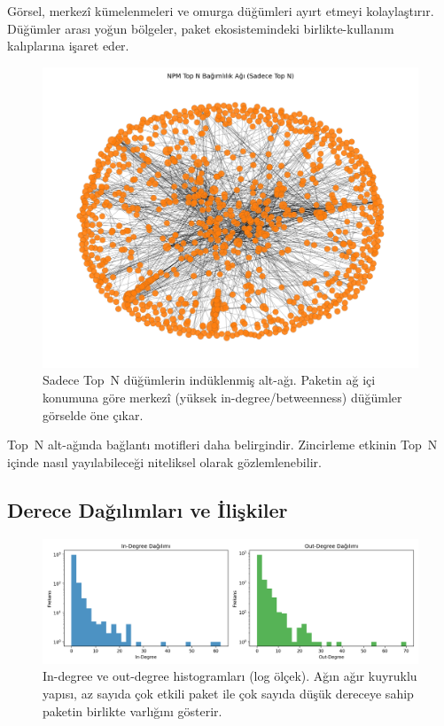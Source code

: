 \documentclass[11pt,a4paper]{article}
\begin{document}
\noindent Görsel, merkezî kümelenmeleri ve omurga düğümleri ayırt etmeyi kolaylaştırır. Düğümler arası yoğun bölgeler, paket ekosistemindeki birlikte-kullanım kalıplarına işaret eder.

\begin{figure}[H]
  \centering
  \includegraphics{network_topN_only.png}
  \caption{Sadece Top~N düğümlerin indüklenmiş alt-ağı. Paketin ağ içi konumuna göre merkezî (yüksek in-degree/betweenness) düğümler görselde öne çıkar.}
\end{figure}

\noindent Top~N alt-ağında bağlantı motifleri daha belirgindir. Zincirleme etkinin Top~N içinde nasıl yayılabileceği niteliksel olarak gözlemlenebilir.

\subsection{Derece Dağılımları ve İlişkiler}
\begin{figure}[H]
  \centering
  \includegraphics{degree_histograms.png}
  \caption{In-degree ve out-degree histogramları (log ölçek). Ağın ağır kuyruklu yapısı, az sayıda çok etkili paket ile çok sayıda düşük dereceye sahip paketin birlikte varlığını gösterir.}
\end{figure}
\end{document}
